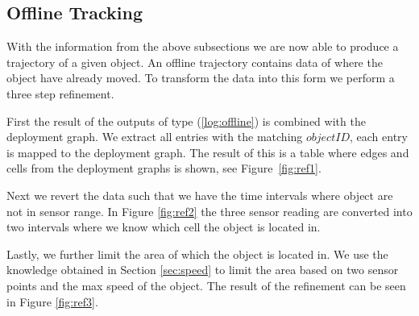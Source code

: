 \subsection{Offline Tracking}
\label{sub:offline}
With the information from the above subsections we are now able to produce a trajectory of a given object.
An offline trajectory contains data of where the object have already moved.
To transform the data into this form we perform a three step refinement.

First the result of the outputs of type (\ref{log:offline}) is combined with the deployment graph.
We extract all entries with the matching $objectID$, each entry is mapped to the deployment graph.
The result of this is a table where edges and cells from the deployment graphs is shown, see Figure~\ref{fig:ref1}.  

Next we revert the data such that we have the time intervals where object are not in sensor range.
In Figure \ref{fig:ref2} the three sensor reading are converted into two intervals where we know which cell the object is located in.

Lastly, we further limit the area of which the object is located in. 
We use the knowledge obtained in Section \ref{sec:speed} to limit the area based on two sensor points and the max speed of the object.
The result of the refinement can be seen in Figure \ref{fig:ref3}.
 


